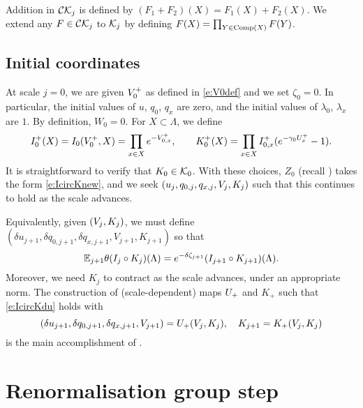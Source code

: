 Addition in $\mathcal{C}\mathcal{K}_j$ is defined by $(F_1 + F_2)(X) = F_1(X) + F_2(X)$.
We extend any $F \in \mathcal{C}\mathcal{K}_j$ to $\mathcal{K}_j$ by defining
$F(X) = \prod_{Y\in{\rm Comp}(X)} F(Y)$.

\subsection{Initial coordinates}

At scale $j = 0$, we are given $V^+_0$ as defined in \eqref{e:V0def}
and we set $\zeta_0 = 0$. In particular,
the initial values of $u$, $q_0$, $q_x$ are zero, and the initial values of $\lambda_0$, $\lambda_x$
are $1$. By definition, $W_0 = 0$.
For $X \subset \Lambda$, we define
\begin{equation}
\label{e:IK0def}
I_0^+(X) = I_0(V^+_0, X) = \prod_{x\in X} e^{-V^+_{0,x}},
	\qquad
K_0^+(X) = \prod_{x \in X} I_{0,x}^+ (e^{-\gamma_0 U^{+}_{x}} - 1).
\end{equation}
It is straightforward to verify that $K_0 \in \mathcal{K}_0$.
With these choices, $Z_0$ (recall )
takes the form \eqref{e:IcircKnew}, and we seek
$(u_j, q_{0,j}, q_{x,j}, V_j, K_j)$ such that this continues to hold as the scale advances.

Equivalently, given $(V_j, K_j)$, we must define
$(\delta u_{j+1}, \delta q_{0,j+1}, \delta q_{x,j+1}, V_{j+1}, K_{j+1})$ so that
\begin{equation} \label{e:IcircKdu}
	\mathbb{E}_{j+1}\theta(I_j \circ K_j)(\Lambda)
	=
	e^{-\delta \zeta_{j+1}}(I_{j+1} \circ K_{j+1})(\Lambda).
\end{equation}
Moreover, we need $K_j$ to contract as the scale advances, under an appropriate norm.
The construction of (scale-dependent) maps $U_+$ and $K_+$ such that
\eqref{e:IcircKdu} holds with
\begin{equation}
(\delta u_{j+1}, \delta q_{0,j+1}, \delta q_{x,j+1}, V_{j+1})
	=
U_+(V_j, K_j),
	\quad
K_{j+1} =  K_+(V_j, K_j)
\end{equation}
is the main accomplishment of \cite{BS-rg-step}.


\section{Renormalisation group step}
\label{sec:step}

